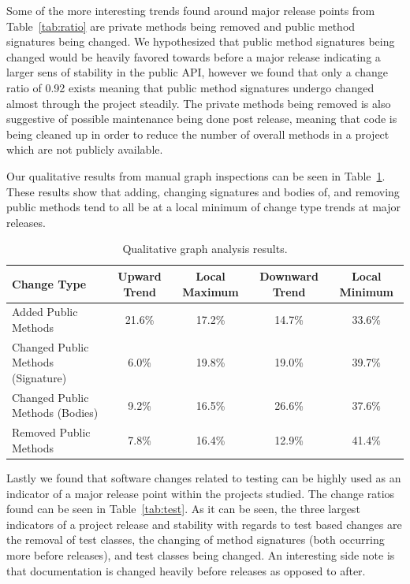 \documentclass[conference]{IEEEtran}
\begin{document}
Some of the more interesting trends found around major release points from Table~\ref{tab:ratio} are private methods being removed and public method signatures
being changed. We hypothesized that public method signatures being changed would be heavily favored towards before a major release indicating a larger sens
of stability in the public API, however we found that only a change ratio of 0.92 exists meaning that public method signatures undergo changed almost through
the project steadily. The private methods being removed is also suggestive of possible maintenance being done post release, meaning that code is being
cleaned up in order to reduce the number of overall methods in a project which are not publicly available.

Our qualitative results from manual graph inspections can be seen in Table~\ref{tab:qual}. These results show that adding, changing signatures and bodies of, and
removing public methods tend to all be at a local minimum of change type trends at major releases.

\begin{table}[tb!]
\begin{center}
\begin{tabular}{| l | c | c | c | c |}
\hline
Change Type & Upward Trend & Local Maximum & Downward Trend & Local Minimum\\
\hline
Added Public Methods & 21.6\% & 17.2\% & 14.7\% & 33.6\% \\
Changed Public Methods (Signature) & 6.0\% & 19.8\% & 19.0\% & 39.7\% \\
Changed Public Methods (Bodies) & 9.2\% & 16.5\% & 26.6\% & 37.6\% \\
Removed Public Methods & 7.8\% & 16.4\% & 12.9\% & 41.4\% \\
\hline
\end{tabular}
\end{center}
\caption{Qualitative graph analysis results. \label{tab:qual}}
\end{table}

Lastly we found that software changes related to testing can be highly used as an indicator of a major release point within the projects studied. The change
ratios found can be seen in Table~\ref{tab:test}. As it can be seen, the three largest indicators of a project release and stability with regards to test based
changes are the removal of test classes, the changing of method signatures (both occurring more before releases), and test classes being changed. An interesting
side note is that documentation is changed heavily before releases as opposed to after.
\end{document}
